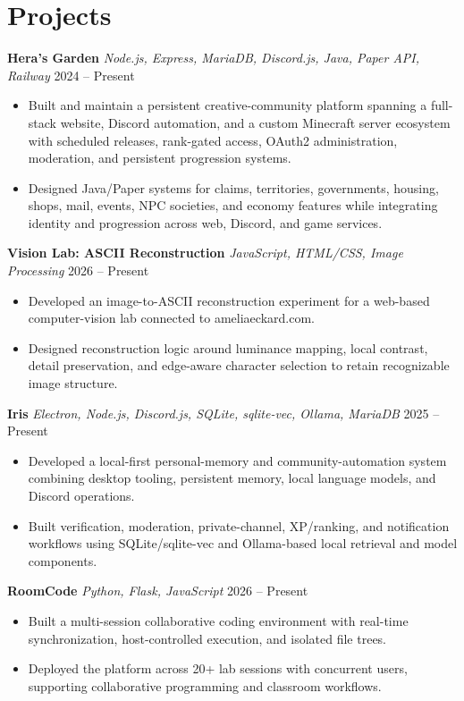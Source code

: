\documentclass[letterpaper,10pt]{article}
\newcommand{\projectentry}[3]{
  \noindent\textbf{#1} \textbar{} \textit{#2} \hfill #3
}
\begin{document}
\section{Projects}

\projectentry
  {Hera's Garden}
  {Node.js, Express, MariaDB, Discord.js, Java, Paper API, Railway}
  {2024 -- Present}
\begin{itemize}
  \item Built and maintain a persistent creative-community platform spanning a full-stack website, Discord automation, and a custom Minecraft server ecosystem with scheduled releases, rank-gated access, OAuth2 administration, moderation, and persistent progression systems.
  \item Designed Java/Paper systems for claims, territories, governments, housing, shops, mail, events, NPC societies, and economy features while integrating identity and progression across web, Discord, and game services.
\end{itemize}

\smallskip

\projectentry
  {Vision Lab: ASCII Reconstruction}
  {JavaScript, HTML/CSS, Image Processing}
  {2026 -- Present}
\begin{itemize}
  \item Developed an image-to-ASCII reconstruction experiment for a web-based computer-vision lab connected to ameliaeckard.com.
  \item Designed reconstruction logic around luminance mapping, local contrast, detail preservation, and edge-aware character selection to retain recognizable image structure.
\end{itemize}

\smallskip

\projectentry
  {Iris}
  {Electron, Node.js, Discord.js, SQLite, sqlite-vec, Ollama, MariaDB}
  {2025 -- Present}
\begin{itemize}
  \item Developed a local-first personal-memory and community-automation system combining desktop tooling, persistent memory, local language models, and Discord operations.
  \item Built verification, moderation, private-channel, XP/ranking, and notification workflows using SQLite/sqlite-vec and Ollama-based local retrieval and model components.
\end{itemize}

\smallskip

\projectentry
  {RoomCode}
  {Python, Flask, JavaScript}
  {2026 -- Present}
\begin{itemize}
  \item Built a multi-session collaborative coding environment with real-time synchronization, host-controlled execution, and isolated file trees.
  \item Deployed the platform across 20+ lab sessions with concurrent users, supporting collaborative programming and classroom workflows.
\end{itemize}
\end{document}
